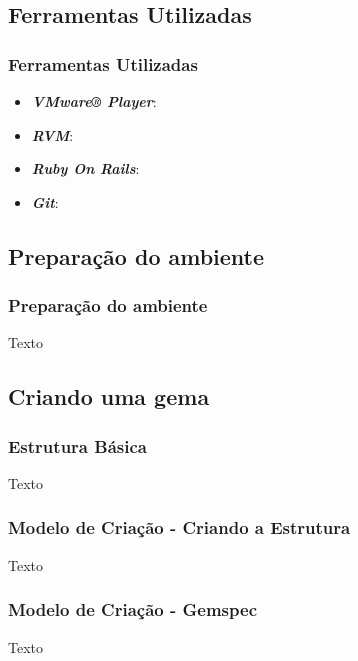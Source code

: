 \documentclass[10pt]{beamer}
\begin{document}
 \subsection{Ferramentas Utilizadas}
\begin{frame}
 \frametitle{Ferramentas Utilizadas}

 \begin{itemize}
 
  \item \emph{\textbf{VMware® Player}}:
  
  \item \emph{\textbf{RVM}}:
  
  \item \emph{\textbf{Ruby On Rails}}:
  
  \item \emph{\textbf{Git}}:
  
 \end{itemize}

 
\end{frame}

\subsection{Preparação do ambiente}
\begin{frame}
 \frametitle{Preparação do ambiente}
 Texto
\end{frame}

\subsection{Criando uma gema}
\begin{frame}
\frametitle{Estrutura Básica}
 Texto
\end{frame}

\begin{frame}
\frametitle{Modelo de Criação - Criando a Estrutura}
 Texto
\end{frame}

\begin{frame}
\frametitle{Modelo de Criação - Gemspec}
 Texto
\end{frame}
\end{document}
